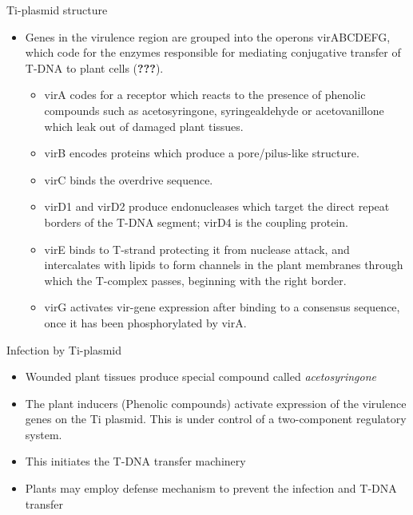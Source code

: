 \documentclass[11pt,dvipsnames,ignorenonframetext,aspectratio=169]{beamer}
\providecommand{\tightlist}{%
  \setlength{\itemsep}{0pt}\setlength{\parskip}{0pt}}
\begin{document}
\begin{frame}{Ti-plasmid structure}
\protect\hypertarget{ti-plasmid-structure-1}{}
\begin{itemize}
\tightlist
\item
  Genes in the virulence region are grouped into the operons virABCDEFG,
  which code for the enzymes responsible for mediating conjugative
  transfer of T-DNA to plant cells ({\textbf{???}}).

  \begin{itemize}
  \tightlist
  \item
    virA codes for a receptor which reacts to the presence of phenolic
    compounds such as acetosyringone, syringealdehyde or acetovanillone
    which leak out of damaged plant tissues.
  \item
    virB encodes proteins which produce a pore/pilus-like structure.
  \item
    virC binds the overdrive sequence.
  \item
    virD1 and virD2 produce endonucleases which target the direct repeat
    borders of the T-DNA segment; virD4 is the coupling protein.
  \item
    virE binds to T-strand protecting it from nuclease attack, and
    intercalates with lipids to form channels in the plant membranes
    through which the T-complex passes, beginning with the right border.
  \item
    virG activates vir-gene expression after binding to a consensus
    sequence, once it has been phosphorylated by virA.
  \end{itemize}
\end{itemize}
\end{frame}

\begin{frame}{Infection by Ti-plasmid}
\protect\hypertarget{infection-by-ti-plasmid}{}
\begin{itemize}
\tightlist
\item
  Wounded plant tissues produce special compound called
  \emph{acetosyringone}
\item
  The plant inducers (Phenolic compounds) activate expression of the
  virulence genes on the Ti plasmid. This is under control of a
  two-component regulatory system.
\item
  This initiates the T-DNA transfer machinery
\item
  Plants may employ defense mechanism to prevent the infection and T-DNA
  transfer
\end{itemize}
\end{frame}
\end{document}
